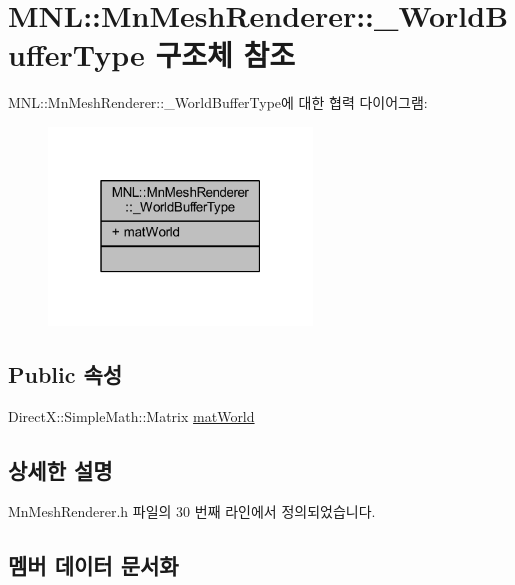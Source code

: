 \hypertarget{struct_m_n_l_1_1_mn_mesh_renderer_1_1___world_buffer_type}{}\section{M\+NL\+:\+:Mn\+Mesh\+Renderer\+:\+:\+\_\+\+World\+Buffer\+Type 구조체 참조}
\label{struct_m_n_l_1_1_mn_mesh_renderer_1_1___world_buffer_type}


M\+NL\+:\+:Mn\+Mesh\+Renderer\+:\+:\+\_\+\+World\+Buffer\+Type에 대한 협력 다이어그램\+:\nopagebreak
\begin{figure}[H]
\begin{center}
\leavevmode
\includegraphics[width=199pt]{struct_m_n_l_1_1_mn_mesh_renderer_1_1___world_buffer_type__coll__graph}
\end{center}
\end{figure}
\subsection*{Public 속성}
\begin{DoxyCompactItemize}
\item 
Direct\+X\+::\+Simple\+Math\+::\+Matrix \hyperlink{struct_m_n_l_1_1_mn_mesh_renderer_1_1___world_buffer_type_a9ebb51c42f4e24827c51cd25c77daed4}{mat\+World}
\end{DoxyCompactItemize}


\subsection{상세한 설명}


Mn\+Mesh\+Renderer.\+h 파일의 30 번째 라인에서 정의되었습니다.



\subsection{멤버 데이터 문서화}
\mbox{\label{struct_m_n_l_1_1_mn_mesh_renderer_1_1___world_buffer_type_a9ebb51c42f4e24827c51cd25c77daed4}} 
